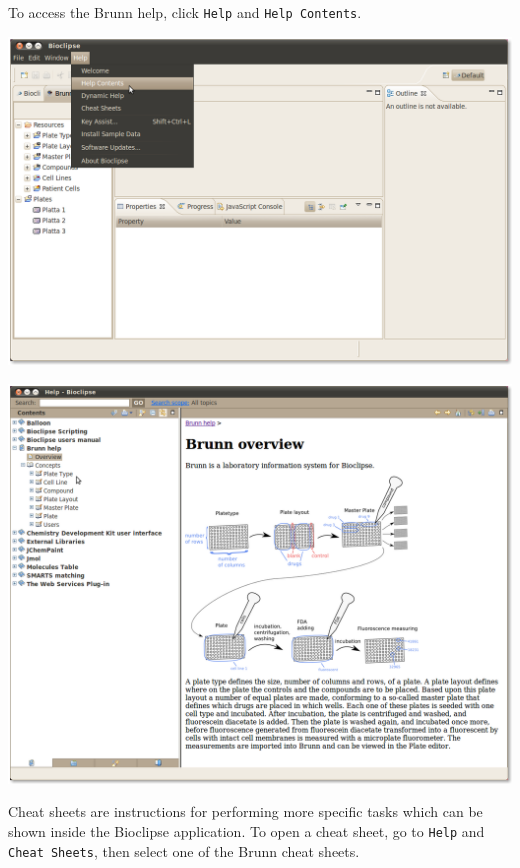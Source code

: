 \documentclass[12pt, a4paper, twoside, openany]{article}
\begin{document}
    \newpage

    To access the Brunn help, click \texttt{Help} and \texttt{Help Contents}.

    \begin{center}
        \includegraphics[scale=1.2]{images/5.png}
    \end{center}

    \begin{center}
        \includegraphics[scale=1.2]{images/6.png}
    \end{center}

    \newpage

    Cheat sheets are instructions for performing more specific tasks which can
    be shown inside the Bioclipse application. To open a cheat sheet, go to
    \texttt{Help} and \texttt{Cheat Sheets}, then select one of the Brunn cheat
    sheets.
\end{document}
